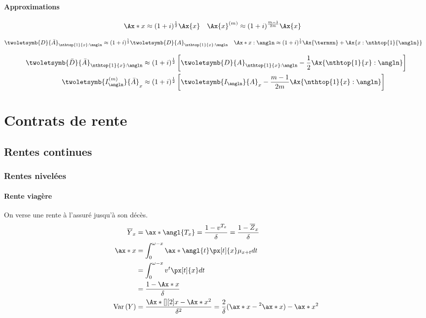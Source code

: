 \documentclass[10pt, french]{article}
\begin{document}
\begin{multicols*}{3}
\paragraph{Approximations}

\begin{align*} 
	\Ax*{x} &\approx (1 + i)^{\frac{1}{2}} \Ax{x}	&
	\Ax{x}^{(m)} &\approx (1 + i)^{\frac{m - 1}{2m}} \Ax{x}
\end{align*}

\begin{align*} 
	\twoletsymb{D}{\bar{A}}_{\nthtop{1}{x}:\angln} 
		&\approx (1 + i)^{\frac{1}{2}} \twoletsymb{D}{A}_{\nthtop{1}{x}:\angln}		&
	\Ax*{x:\angln} 
		&\approx (1 + i)^{\frac{1}{2}} \Ax{\termxn} + \Ax{x:\nthtop{1}{\angln}}  
\end{align*}

\begin{align*}
	\twoletsymb{\bar{D}}{\bar{A}}_{\nthtop{1}{x}:\angln} 
		&\approx (1 + i)^{\frac{1}{2}} 
		\left[
			\twoletsymb{D}{A}_{\nthtop{1}{x}:\angln}	-
			\frac{1}{2}	\Ax{\nthtop{1}{x}:\angln}
		\right] \\
	\twoletsymb{I_{\angln}^{(m)}}{\bar{A}}_{x} 
		&\approx (1 + i)^{\frac{1}{2}} 
		\left[
			\twoletsymb{I_{\angln}}{A}_{x}	-
			\frac{m - 1}{2m}	\Ax{\nthtop{1}{x}:\angln}
		\right]
\end{align*}

\section{Contrats de rente}

\subsection*{Rentes continues}

\subsubsection*{\textcolor{amber(sae/ece)}{Rentes nivelées}}

\paragraph{Rente viagère} On verse une rente à l'assuré jusqu'à son décès. 
\begin{align*}
\overline{Y}_{x}	&  = \ax*{\angl{T_{x}}} = \frac{1-v^{T_x}}{\delta} = \frac{1 -\overline{Z}_x}{\delta} \\
\ax*{x} 
	& = \int_{0}^{\omega - x}  \ax*{\angl{t}}  \px[t]{x} \mu_{x+t} dt \\
	& = \int_{0}^{\omega - x} v^t \px[t]{x} dt \\
	& = \frac{1 - \Ax*{x}}{\delta} \\
\variance{Y}	 
	&=	\frac{\Ax*[][2]{x} - \Ax*{x}^2}{\delta^2} 
	=	\frac{2}{\delta} (\ax*{x} - \prescript{2}{}{\ax*{x}}) - \ax*{x}^2
\end{align*}


\end{multicols*}
\end{document}
